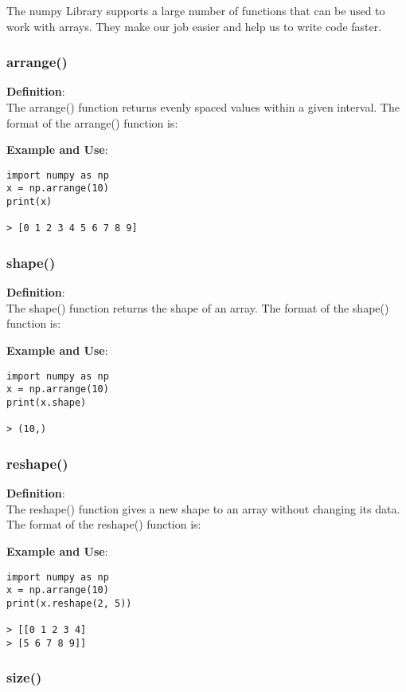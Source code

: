 \documentclass[11pt]{article}
\begin{document}
The numpy Library supports a large number of functions that can be used to work with arrays. They make our job easier and help us to write code faster.

\subsubsection{arrange()}

\textbf{Definition}:\\
The arrange() function returns evenly spaced values within a given interval. The format of the arrange() function is:

\textbf{Example and Use}:
\begin{verbatim}
import numpy as np
x = np.arrange(10)
print(x)

> [0 1 2 3 4 5 6 7 8 9]
\end{verbatim}

\subsubsection{shape()}

\textbf{Definition}:\\
The shape() function returns the shape of an array. The format of the shape() function is:

\textbf{Example and Use}:

\begin{verbatim}
import numpy as np
x = np.arrange(10)
print(x.shape)

> (10,)
\end{verbatim}


\subsubsection{reshape()}

\textbf{Definition}:\\
The reshape() function gives a new shape to an array without changing its data. The format of the reshape() function is:

\textbf{Example and Use}:
\begin{verbatim}
import numpy as np
x = np.arrange(10)
print(x.reshape(2, 5))

> [[0 1 2 3 4]
> [5 6 7 8 9]]
\end{verbatim}

\subsubsection{size()}
\end{document}
